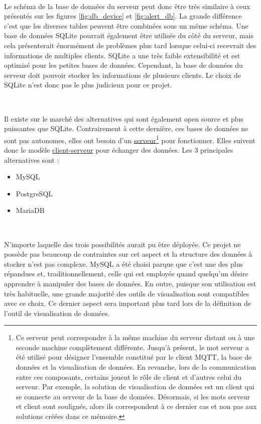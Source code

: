 ~

\noindent
Le schéma de la base de données du serveur peut donc être très similaire à ceux présentés sur les figures \ref{fig:db_device} et \ref{fig:alert_db}. La grande différence c’est que les diverses tables peuvent être combinées sous un même schéma. Une base de données SQLite pourrait également être utilisée du côté du serveur, mais cela présenterait énormément de problèmes plus tard lorsque celui-ci recevrait des informations de multiples clients. SQLite a une très faible extensibilité et est optimisé pour les petites bases de données. Cependant, la base de données du serveur doit pouvoir stocker les informations de plusieurs clients. Le choix de SQLite n’est donc pas le plus judicieux pour ce projet.

~

\noindent
Il existe sur le marché des alternatives qui sont également open source et plus puissantes que SQLite. Contrairement à cette dernière, ces bases de données ne sont pas autonomes, elles ont besoin d’un \underline{serveur}\footnote{Ce serveur peut correspondre à la même machine du serveur distant ou à une seconde machine complètement différente. Jusqu'à présent, le mot serveur a été utilisé pour désigner l'ensemble constitué par le client MQTT, la base de données et la visualisation de données. En revanche, lors de la communication entre ces composants, certains jouent le rôle de client et d’autres celui du serveur. Par exemple, la solution de visualisation de données est un client qui se connecte au serveur de la base de données. Désormais, si les mots serveur et client sont soulignés, alors ils correspondent à ce dernier cas et non pas aux solutions créées dans ce mémoire.} pour fonctionner. Elles suivent donc le modèle \underline{client-serveur} pour échanger des données. Les 3 principales alternatives sont :

\begin{itemize}
  \item MySQL
  \item PostgreSQL
  \item MariaDB
\end{itemize}

~

\noindent
N’importe laquelle des trois possibilités aurait pu être déployée. Ce projet ne possède pas beaucoup de contraintes sur cet aspect et la structure des données à stocker n’est pas complexe. MySQL a été choisi parque que c’est une des plus répandues et, traditionnellement, celle qui est employée quand quelqu’un désire apprendre à manipuler des bases de données. En outre, puisque son utilisation est très habituelle, une grande majorité des outils de visualisation sont compatibles avec ce choix. Ce dernier aspect sera important plus tard lors de la définition de l’outil de visualisation de données.

